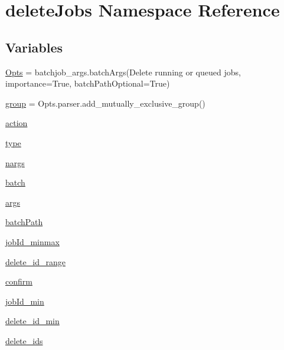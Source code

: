 \hypertarget{namespacedeleteJobs}{}\section{delete\+Jobs Namespace Reference}
\label{namespacedeleteJobs}
\subsection*{Variables}
\begin{DoxyCompactItemize}
\item 
\mbox{\hyperlink{namespacedeleteJobs_ad0a42535d7700e9b5f1892a97996856d}{Opts}} = batchjob\+\_\+args.\+batch\+Args(\textquotesingle{}Delete running or queued jobs\textquotesingle{}, importance=True, batch\+Path\+Optional=True)
\item 
\mbox{\hyperlink{namespacedeleteJobs_a26582c9d620ecd25e18316543dbe9e76}{group}} = Opts.\+parser.\+add\+\_\+mutually\+\_\+exclusive\+\_\+group()
\item 
\mbox{\hyperlink{namespacedeleteJobs_a0a1a15775632b58b51a4280c1db6bd4a}{action}}
\item 
\mbox{\hyperlink{namespacedeleteJobs_ab30c5228407117e7324b840996ed3b8c}{type}}
\item 
\mbox{\hyperlink{namespacedeleteJobs_aaea35ad3b67e93c1ee0c9b4987fb60a1}{nargs}}
\item 
\mbox{\hyperlink{namespacedeleteJobs_ae2c247c650877023c6a23c04466f14ac}{batch}}
\item 
\mbox{\hyperlink{namespacedeleteJobs_acc3288fec331cb34291501846be6e651}{args}}
\item 
\mbox{\hyperlink{namespacedeleteJobs_a964a9c0e77da9568953c0059353931e2}{batch\+Path}}
\item 
\mbox{\hyperlink{namespacedeleteJobs_a73c35f0181c09c09c6c3ca82b2b4ae4f}{job\+Id\+\_\+minmax}}
\item 
\mbox{\hyperlink{namespacedeleteJobs_a95460e34fd9d3a90830496e42f42fc31}{delete\+\_\+id\+\_\+range}}
\item 
\mbox{\hyperlink{namespacedeleteJobs_a13ec382ac7df5c49465b126c89148519}{confirm}}
\item 
\mbox{\hyperlink{namespacedeleteJobs_a478fdc6b5b46d96eb43a149166423548}{job\+Id\+\_\+min}}
\item 
\mbox{\hyperlink{namespacedeleteJobs_a76289a5bbebebab831627907e3c9dd43}{delete\+\_\+id\+\_\+min}}
\item 
\mbox{\hyperlink{namespacedeleteJobs_ac6f37e8a148be0e5076a685605da7c01}{delete\+\_\+ids}}

\end{DoxyCompactItemize}
